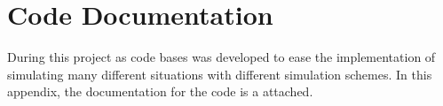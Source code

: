 \chapter{Code Documentation}
During this project as code bases was developed to ease the implementation of simulating many different situations with different simulation schemes. In this appendix, the documentation for the code is a attached.




